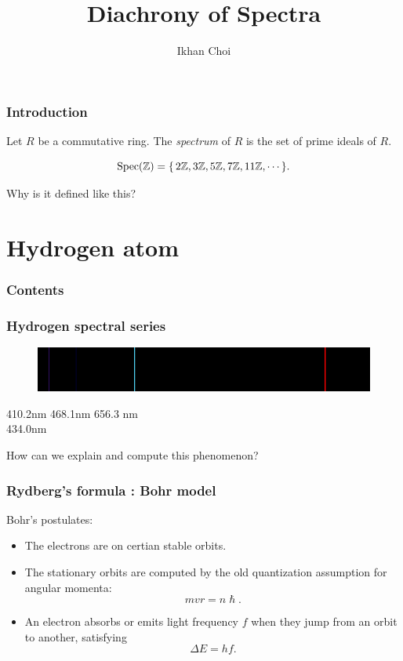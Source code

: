 \documentclass{beamer}
\title{Diachrony of Spectra}
\author{Ikhan Choi}
\begin{document}
\maketitle

\begin{frame}
\frametitle{Introduction}
  \pause
  \begin{defn}
    Let $R$ be a commutative ring.
    The \emph{spectrum} of $R$ is the set of prime ideals of $R$.
  \end{defn}
  \pause
  \begin{ex}
  	\[\operatorname{Spec}(\mathbb{Z})=\{\,2\mathbb{Z},3\mathbb{Z},5\mathbb{Z},7\mathbb{Z},11\mathbb{Z},\cdots\,\}.\]
  \end{ex}
  \pause
  \begin{qn}
    Why is it defined like this?
  \end{qn}
\end{frame}


\section{Hydrogen atom}

\begin{frame}
\frametitle{Contents}
  \tableofcontents[currentsection]
\end{frame}

\begin{frame}
\frametitle{Hydrogen spectral series}
  \begin{figure}\includegraphics[scale=.4]{emission.png}\end{figure}
  \pause 410.2nm \hspace{2em} 468.1nm \hspace{12em} 656.3 nm\\ \hspace{2em} 434.0nm\\
  \bigskip
  \pause
  \begin{qn}
    How can we explain and compute this phenomenon?
  \end{qn}
\end{frame}

\begin{frame}
\frametitle{Rydberg's formula : Bohr model}
  Bohr's postulates:\pause
  \begin{itemize}[<+->]
    \item The electrons are on certian stable orbits.
    \item The stationary orbits are computed by the old quantization assumption for angular momenta:
    \[mvr=n\hslash.\]
    \item An electron absorbs or emits light frequency $f$ when they jump from an orbit to another, satisfying
    \[\Delta E=hf.\]
  \end{itemize}
\end{frame}
\end{document}
